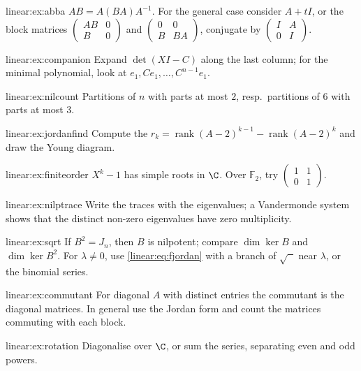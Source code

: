 \begin{hint}{linear:ex:abba}
$AB=A(BA)A^{-1}$. For the general case consider $A+tI$, or the block matrices $\begin{pmatrix}AB&0\\B&0\end{pmatrix}$ and
$\begin{pmatrix}0&0\\B&BA\end{pmatrix}$, conjugate by $\begin{pmatrix}I&A\\0&I\end{pmatrix}$.
\end{hint}
\begin{hint}{linear:ex:companion}
Expand $\det(XI-C)$ along the last column; for the minimal polynomial, look at $e_1,Ce_1,\dots,C^{n-1}e_1$.
\end{hint}
\begin{hint}{linear:ex:nilcount}
Partitions of $n$ with parts at most $2$, resp.\ partitions of $6$ with parts at most $3$.
\end{hint}
\begin{hint}{linear:ex:jordanfind}
Compute the $r_k=\operatorname{rank}(A-2)^{k-1}-\operatorname{rank}(A-2)^k$ and draw the Young diagram.
\end{hint}
\begin{hint}{linear:ex:finiteorder}
$X^k-1$ has simple roots in $\C$. Over $\mathbb F_2$, try $\begin{pmatrix}1&1\\0&1\end{pmatrix}$.
\end{hint}
\begin{hint}{linear:ex:nilptrace}
Write the traces with the eigenvalues; a Vandermonde system shows that the distinct non-zero eigenvalues have zero
multiplicity.
\end{hint}
\begin{hint}{linear:ex:sqrt}
If $B^2=J_n$, then $B$ is nilpotent; compare $\dim\ker B$ and $\dim\ker B^2$. For $\lambda\ne0$, use \eqref{linear:eq:fjordan} with a
branch of $\sqrt{\phantom{x}}$ near $\lambda$, or the binomial series.
\end{hint}
\begin{hint}{linear:ex:commutant}
For diagonal $A$ with distinct entries the commutant is the diagonal matrices. In general use the Jordan form and count
the matrices commuting with each block.
\end{hint}
\begin{hint}{linear:ex:rotation}
Diagonalise over $\C$, or sum the series, separating even and odd powers.
\end{hint}
